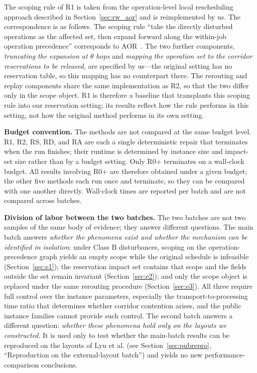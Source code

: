 \documentclass[manuscript,screen,review]{acmart}
\begin{document}
The scoping rule of R1 is taken from the operation-level
local rescheduling approach described in Section~\ref{sec:rw_aor} and is reimplemented by us. The correspondence is as follows. The scoping rule ``take the directly disturbed operations as the affected set,
then expand forward along the within-job operation precedence'' corresponds to
AOR~\cite{subramaniam2003maor}.
The two further components, \emph{truncating the expansion at \(\theta\) hops} and \emph{mapping the operation set to the corridor reservations to be released},
are specified by us---the original setting has no reservation table, so this mapping has no counterpart there.
The rerouting and replay components share the same implementation as R2, so that the two differ only in the scope object.
R1 is therefore a baseline that transplants this scoping rule into our reservation setting; its results reflect how the rule performs in this setting,
not how the original method performs in its own setting.

\textbf{Budget convention.}
The methods are not compared at the same budget level. R1, R2, RS, RD, and RA are each a single deterministic repair
that terminates when the run finishes; their runtime is determined by instance size and impact-set size rather than by a budget setting. Only R0+ terminates on a wall-clock budget.
All results involving R0+ are therefore obtained under a given budget; the other five methods each run once and terminate, so they can be compared with one another directly. Wall-clock times are reported per batch and are not compared across batches.

\textbf{Division of labor between the two batches.}
The two batches are not two samples of the same body of evidence; they answer different questions.
The main batch answers \emph{whether the phenomena exist and whether the mechanism can be identified in isolation}: under Class B disturbances, scoping on the operation-precedence graph yields an empty scope while the original schedule is infeasible
(Section~\ref{sec:e1}); the reservation impact set contains that scope and the fields outside the set remain invariant (Section~\ref{sec:e2});
and only the scope object is replaced under the same rerouting procedure (Section~\ref{sec:e3}). All three require full control over the instance parameters,
especially the transport-to-processing time ratio that determines whether corridor contention arises, and the public instance families cannot provide such control. The second batch answers a different question: \emph{whether these phenomena
hold only on the layouts we constructed}. It is used only to test whether the main-batch results can be reproduced on the layouts of Lyu et al.
(see Section~\ref{sec:pubrepro}, ``Reproduction on the external-layout batch'') and yields no new performance-comparison conclusions.
\end{document}
